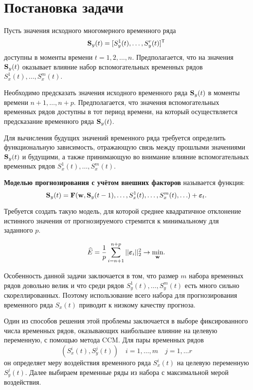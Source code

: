 \documentclass[a4paper, 12pt]{article}
\begin{document}
\section{Постановка задачи}
Пусть значения исходного многомерного временного ряда 
\[\mathbf{S}_y(t) = [S_y^1(t), \ldots, S_y^r(t)]^{\mathsf{T}}\]
доступны в моменты времени $t = 1, 2, \ldots, n$. Предполагается, что на значения $\mathbf{S}_y(t)$ оказывает влияние набор вспомогательных временных рядов $S_x^1(t), \ldots, S_x^m(t)$.

Необходимо предсказать значения исходного временного ряда $\mathbf{S}_y(t)$ в моменты времени $n+1, \ldots, n+p$. 
Предполагается, что значения вспомогательных временных рядов доступны в тот период времени, на который осуществляется предсказание временного ряда $\mathbf{S}_y(t)$.

Для вычисления будущих значений временного ряда требуется определить функциональную зависимость, отражающую связь между прошлыми значениями $\mathbf{S}_y(t)$ и будущими, а также принимающую во внимание влияние вспомогательных временных рядов $S_x^1(t), \ldots, S_x^m(t)$.

\begin{definition}
	\textbf{Моделью прогнозирования с учётом внешних факторов} называется функция:
	\begin{equation*}
		\mathbf{S}_y(t) = \mathbf{F}(\mathbf{w}, \mathbf{S}_y(t-1), \ldots, S_x^1(t), \ldots, S_x^m(t), \ldots) + \boldsymbol{\varepsilon}_t.
	\end{equation*}
\end{definition}

Требуется создать такую модель, для которой среднее квадратичное отклонение истинного значения от прогнозируемого стремится к минимальному для заданного $p$. 

\begin{equation*}
	\widehat{E} = \dfrac{1}{p} \sum\limits_{i=n+1}^{n+p} ||\boldsymbol{\varepsilon}_i||_2^2 \rightarrow \underset{\mathbf{w}}{\text{min}}.
\end{equation*}

Особенность данной задачи заключается в том, что размер $m$ набора временных рядов довольно велик и что среди рядов $S_y^1(t), \ldots, S_y^m(t)$ есть много сильно скореллированных. 
Поэтому использование всего набора для прогнозирования временного ряда $S_x(t)$ приводит к низкому качеству прогноза. 

Один из способов решения этой проблемы заключается в выборе фиксированного числа временных рядов, оказывающих наибольшее влияние на целевую переменную, с помощью метода CCM. 
Для пары временных рядов
\begin{equation*}
(S_x^i(t), S_y^j(t)) \quad i = 1, \ldots, m \quad j = 1, \ldots r
\end{equation*} 
он определяет меру воздействия временного ряда $S_x^i(t)$ на целевую переменную $S_y^j(t)$. 
Далее выбираем временные ряды из набора с максимальной мерой воздействия.
\end{document}
